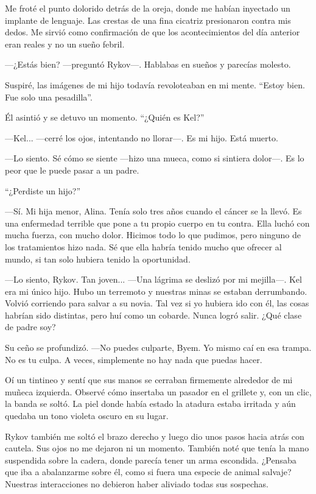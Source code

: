 Me froté el punto dolorido detrás de la oreja, donde me habían inyectado un implante de lenguaje. Las crestas de una fina cicatriz presionaron contra mis dedos. Me sirvió como confirmación de que los acontecimientos del día anterior eran reales y no un sueño febril.

—¿Estás bien? —preguntó Rykov—. Hablabas en sueños y parecías molesto.

Suspiré, las imágenes de mi hijo todavía revoloteaban en mi mente. “Estoy bien. Fue solo una pesadilla”.

Él asintió y se detuvo un momento. “¿Quién es Kel?”

—Kel... —cerré los ojos, intentando no llorar—. Es mi hijo. Está muerto.

—Lo siento. Sé cómo se siente —hizo una mueca, como si sintiera dolor—. Es lo peor que le puede pasar a un padre.

“¿Perdiste un hijo?”

—Sí. Mi hija menor, Alina. Tenía solo tres años cuando el cáncer se la llevó. Es una enfermedad terrible que pone a tu propio cuerpo en tu contra. Ella luchó con mucha fuerza, con mucho dolor. Hicimos todo lo que pudimos, pero ninguno de los tratamientos hizo nada. Sé que ella habría tenido mucho que ofrecer al mundo, si tan solo hubiera tenido la oportunidad.

—Lo siento, Rykov. Tan joven... —Una lágrima se deslizó por mi mejilla—. Kel era mi único hijo. Hubo un terremoto y nuestras minas se estaban derrumbando. Volvió corriendo para salvar a su novia. Tal vez si yo hubiera ido con él, las cosas habrían sido distintas, pero huí como un cobarde. Nunca logró salir. ¿Qué clase de padre soy?

Su ceño se profundizó. —No puedes culparte, Byem. Yo mismo caí en esa trampa. No es tu culpa. A veces, simplemente no hay nada que puedas hacer.

Oí un tintineo y sentí que sus manos se cerraban firmemente alrededor de mi muñeca izquierda. Observé cómo insertaba un pasador en el grillete y, con un clic, la banda se soltó. La piel donde había estado la atadura estaba irritada y aún quedaba un tono violeta oscuro en su lugar.

Rykov también me soltó el brazo derecho y luego dio unos pasos hacia atrás con cautela. Sus ojos no me dejaron ni un momento. También noté que tenía la mano suspendida sobre la cadera, donde parecía tener un arma escondida. ¿Pensaba que iba a abalanzarme sobre él, como si fuera una especie de animal salvaje? Nuestras interacciones no debieron haber aliviado todas sus sospechas.

